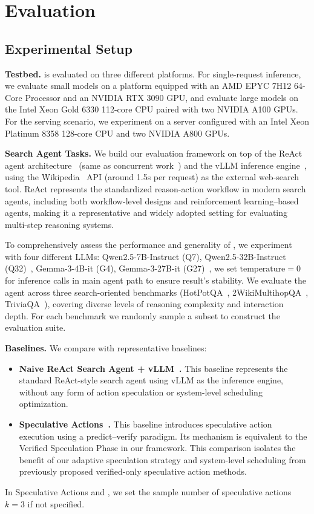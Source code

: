 \section{Evaluation}
\subsection{Experimental Setup}
\textbf{Testbed.}
\system is evaluated on three different platforms.
For single-request inference, we evaluate small models on a platform equipped with an AMD EPYC 7H12 64-Core Processor and an NVIDIA RTX 3090 GPU, and evaluate large models on the Intel Xeon Gold 6330 112-core CPU paired with two NVIDIA A100 GPUs. 
For the serving scenario, we experiment on a server configured with an Intel Xeon Platinum 8358 128-core CPU and two NVIDIA A800 GPUs.

\noindent
\textbf{Search Agent Tasks.}
We build our evaluation framework on top of the ReAct agent architecture~\cite{react} (same as concurrent work~\cite{speculativeactions}) and the vLLM inference engine~\cite{vllm}, using the Wikipedia~\cite{wikipedia} API (around 1.5s per request) as the external web-search tool. 
ReAct represents the standardized reason-action workflow in modern search agents, including both workflow-level designs and reinforcement learning–based agents, making it a representative and widely adopted setting for evaluating multi-step reasoning systems. 

To comprehensively assess the performance and generality of \system, we experiment with four different LLMs: Qwen2.5-7B-Instruct (Q7), Qwen2.5-32B-Instruct (Q32)~\cite{qwen2.5}, Gemma-3-4B-it (G4), Gemma-3-27B-it (G27)~\cite{Gemma3}, we set $\text{temperature}=0$ for inference calls in main agent path to ensure result's stability.
We evaluate the agent across three search-oriented benchmarks (HotPotQA~\cite{hotpotqa}, 2WikiMultihopQA~\cite{2wikimultihop}, TriviaQA~\cite{triviaqa}), covering diverse levels of reasoning complexity and interaction depth.
For each benchmark we randomly sample a subset to construct the evaluation suite.

\noindent
\textbf{Baselines.}
We compare \system with representative baselines:
\begin{itemize}[leftmargin=*]
    \item \textbf{Naive ReAct Search Agent + vLLM~\cite{react,vllm}.} This baseline represents the standard ReAct-style search agent using vLLM as the inference engine, without any form of action speculation or system-level scheduling optimization.

    \item \textbf{Speculative Actions~\cite{speculativeactions}.} This baseline introduces speculative action execution using a predict–verify paradigm.  
    Its mechanism is equivalent to the Verified Speculation Phase in our framework. 
    This comparison isolates the benefit of our adaptive speculation strategy and system-level scheduling from previously proposed verified-only speculative action methods.
\end{itemize}
In Speculative Actions and \system, we set the sample number of speculative actions $k=3$ if not specified.

